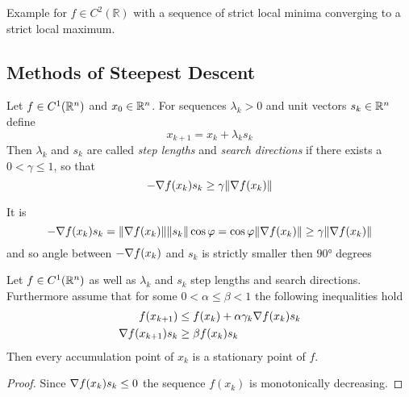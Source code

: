 \begin{algorithm}\label{algo:golden_section_search}
\end{algorithm}
\inputminted[fontsize=\small, framesep=0.35cm, frame=lines, python3=true]{python}{python/golden_section.py}
\bigskip

\begin{exercise}
    Example for \( f \in C^2(\mathbb{R}) \) with a sequence of strict local minima converging to a strict local maximum.
\end{exercise}
\bigskip



\subsection{Methods of Steepest Descent}
\bigskip


\begin{definition}
    Let \( f \in C^1(\mathbb{R}^n) \) and \( x_0 \in \mathbb{R}^n \). For sequences \( \lambda_k > 0 \) and
    unit vectors \( s_k \in \mathbb{R}^n \) define
    \[
        x_{k + 1} = x_k + \lambda_k s_k
    \]
    Then \( \lambda_k \) and  \( s_k \) are called \emph{step lengths} and \emph{search directions} if there
    exists a \( 0 < \gamma \le 1 \), so that
    \[
        - \nabla f(x_k) s_k \ge \gamma \|\nabla f(x_k)\|
    \]
\end{definition}
\bigskip


\begin{remark}
    It is
    \[
        - \nabla f(x_k) s_k = \|\nabla f(x_k)\| \|s_k\| \cos\varphi =
        \cos\varphi \|\nabla f(x_k)\| \ge \gamma \|\nabla f(x_k)\|
    \]
    and so angle between \( -\nabla f(x_k) \) and \( s_k \) is strictly smaller then \( \ang{90} \) degrees
\end{remark}
\bigskip


\begin{theorem}\label{thm:steepest_descent}
    Let \( f \in C^1(\mathbb{R}^n) \) as well as \( \lambda_k \) and \( s_k \) step lengths and search directions.
    Furthermore assume that for some \( 0 < \alpha \le \beta < 1 \) the following inequalities hold
    \[
        \begin{split}
            f(x_{k + 1}) & \le f(x_k) + \alpha \gamma_k \nabla f(x_k) s_k \\
            \nabla f(x_{k + 1}) s_k & \ge \beta f(x_k) s_k
        \end{split}
    \]
    Then every accumulation point of \( x_k \) is a stationary point of \( f \).
\end{theorem}

\begin{proof}
    Since \( \nabla f(x_k) s_k \le 0 \) the sequence \( f(x_k) \) is monotonically decreasing.
\end{proof}
